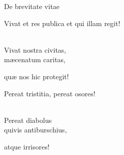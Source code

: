 \begin{song}{De brevitate vitae}
    \showversenumber
	\begin{repetition}
		Vivat et res publica et qui illam regit!
	\end{repetition}\\
	Vivat nostra civitas,\\
	mæcenatum caritas,\\
	\begin{repetition}
		quæ nos hic protegit!
	\end{repetition}
	
    \showversenumber
	\begin{repetition}
		Pereat tristitia, pereat osores!
	\end{repetition}\\
	Pereat diabolus\\
	quivis antiburschius,\\
	\begin{repetition}
		atque irrisores!
	\end{repetition}
	
\end{song}
